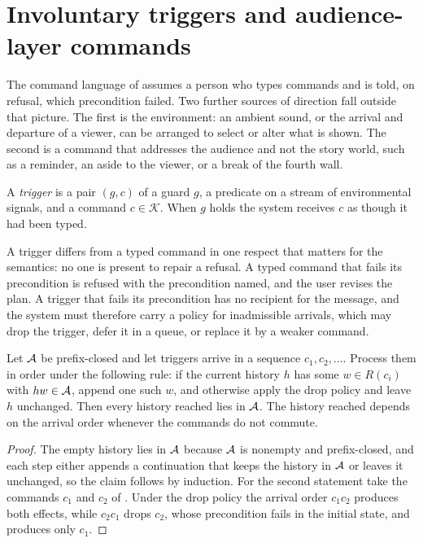 \section{Involuntary triggers and audience-layer commands}\label{sec:triggers}

The command language of  assumes a person who types commands and is told, on refusal, which precondition failed. Two further sources of direction fall outside that picture. The first is the environment: an ambient sound, or the arrival and departure of a viewer, can be arranged to select or alter what is shown. The second is a command that addresses the audience and not the story world, such as a reminder, an aside to the viewer, or a break of the fourth wall.

\begin{definition}[Trigger]\label{def:trigger}
A \emph{trigger} is a pair $(g,c)$ of a guard $g$, a predicate on a stream of environmental signals, and a command $c\in\mathcal{K}$. When $g$ holds the system receives $c$ as though it had been typed.
\end{definition}

A trigger differs from a typed command in one respect that matters for the semantics: no one is present to repair a refusal. A typed command that fails its precondition is refused with the precondition named, and the user revises the plan. A trigger that fails its precondition has no recipient for the message, and the system must therefore carry a policy for inadmissible arrivals, which may drop the trigger, defer it in a queue, or replace it by a weaker command.

\begin{proposition}\label{prop:filtered}
Let $\mathcal{A}$ be prefix-closed and let triggers arrive in a sequence $c_1,c_2,\dots$. Process them in order under the following rule: if the current history $h$ has some $w\in R(c_i)$ with $hw\in\mathcal{A}$, append one such $w$, and otherwise apply the drop policy and leave $h$ unchanged. Then every history reached lies in $\mathcal{A}$. The history reached depends on the arrival order whenever the commands do not commute.
\end{proposition}

\begin{proof}
The empty history lies in $\mathcal{A}$ because $\mathcal{A}$ is nonempty and prefix-closed, and each step either appends a continuation that keeps the history in $\mathcal{A}$ or leaves it unchanged, so the claim follows by induction. For the second statement take the commands $c_1$ and $c_2$ of . Under the drop policy the arrival order $c_1c_2$ produces both effects, while $c_2c_1$ drops $c_2$, whose precondition fails in the initial state, and produces only $c_1$.
\end{proof}

